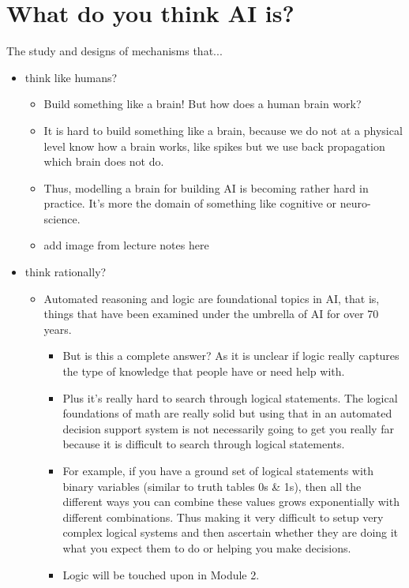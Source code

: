 \documentclass[12pt]{article}
\begin{document}
\section*{What do you think AI is?}
The study and designs of mechanisms that...
\begin{itemize}
    \item think like humans? 
    \begin{itemize}
        \item Build something like a brain! But how does a human brain work?
        \item It is hard to build something like a brain, because we do not at a physical level know how a brain works, like spikes but we use back propagation which brain does not do.
        \item Thus, modelling a brain for building AI is becoming rather hard in practice. It's more the domain of something like cognitive or neuro-science.
        \item add image from lecture notes here
    \end{itemize}
    \item think rationally?
    \begin{itemize}
        \item Automated reasoning and logic are foundational topics in AI, that is, things that have been examined under the umbrella of AI for over 70 years.
        \begin{itemize}
            \item But is this a complete answer? As it is unclear if logic really captures the type of knowledge that people have or need help with.  
            \item Plus it's really hard to search through logical statements. The logical foundations of math are really solid but using that in an automated decision support system is not necessarily going to get you really far because it is difficult to search through logical statements.
            \item For example, if you have a ground set of logical statements with binary variables (similar to truth tables 0s \& 1s), then all the different ways you can combine these values grows exponentially with different combinations. Thus making it very difficult to setup very complex logical systems and then ascertain whether they are doing it what you expect them to do or helping you make decisions.
            \item Logic will be touched upon in Module 2.
        \end{itemize}

\end{itemize}
\end{itemize}
\end{document}
